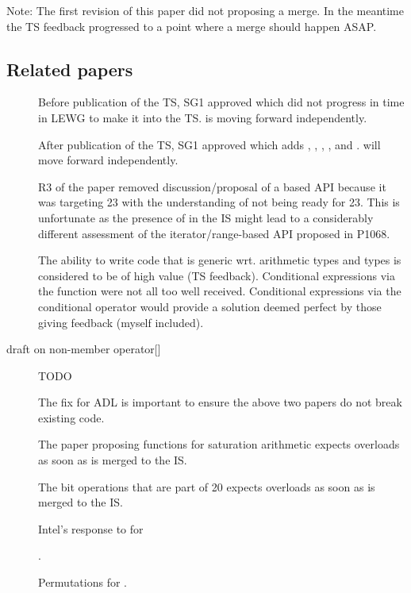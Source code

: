 Note: The first revision of this paper did not proposing a merge.
In the meantime the TS feedback progressed to a point where a merge should happen ASAP.

\subsection{Related papers}
\begin{description}
  \item[] Before publication of the TS, SG1 approved \cite{P0350R0} which did not progress in time in LEWG to make it into the TS.
     is moving forward independently.

  \item[] After publication of the TS, SG1 approved \cite{P0918R2} which adds , , , , and .
     will move forward independently.

  \item[] R3 of the paper removed discussion/proposal of a  based API because it was targeting \CC{}23 with the understanding of  not being ready for \CC{}23.
    This is unfortunate as the presence of  in the IS might lead to a considerably different assessment of the iterator/range-based API proposed in P1068.

  \item[] The ability to write code that is generic wrt. arithmetic types and  types is considered to be of high value (TS feedback).
    Conditional expressions via the  function were not all too well received.
    Conditional expressions via the conditional operator would provide a solution deemed perfect by those giving feedback (myself included).

  \item[draft on non-member {operator[]}] TODO

  \item[] The fix for ADL is important to ensure the above two papers do not break existing code.

  \item[] The paper proposing functions for saturation arithmetic expects  overloads as soon as  is merged to the IS.

  \item[] The bit operations that are part of \CC{}20 expects  overloads as soon as  is merged to the IS.

  \item[] Intel’s response to  for 

  \item[] .

  \item[] Permutations for .

\end{description}
